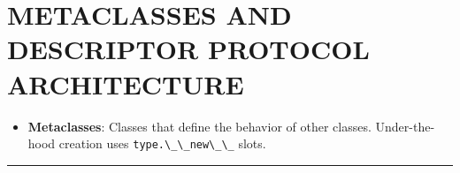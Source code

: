\hypertarget{metaclasses-and-descriptor-protocol-architecture}{%
\chapter{METACLASSES AND DESCRIPTOR PROTOCOL
ARCHITECTURE}\label{metaclasses-and-descriptor-protocol-architecture}}

\begin{itemize}
\tightlist
\item
  \textbf{Metaclasses}: Classes that define the behavior of other
  classes. Under-the-hood creation uses
  \passthrough{\lstinline!type.\_\_new\_\_!} slots.
\end{itemize}

\begin{center}\rule{0.5\linewidth}{0.5pt}\end{center}
